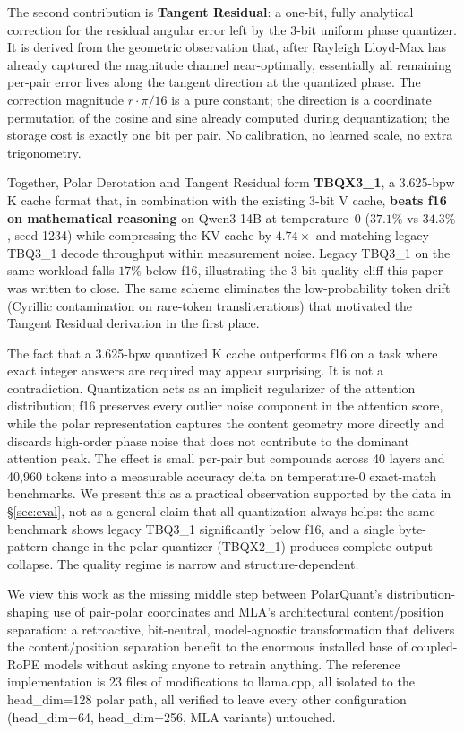 \documentclass[10pt,twocolumn]{article}
\begin{document}
The second contribution is \textbf{Tangent Residual}: a one-bit, fully analytical correction for the residual angular error left by the 3-bit uniform phase quantizer. It is derived from the geometric observation that, after Rayleigh Lloyd-Max has already captured the magnitude channel near-optimally, essentially all remaining per-pair error lives along the tangent direction at the quantized phase. The correction magnitude $r\cdot\pi/16$ is a pure constant; the direction is a coordinate permutation of the cosine and sine already computed during dequantization; the storage cost is exactly one bit per pair. No calibration, no learned scale, no extra trigonometry.

Together, Polar Derotation and Tangent Residual form \textbf{TBQX3\_1}, a 3.625-bpw K cache format that, in combination with the existing 3-bit V cache, \textbf{beats f16 on mathematical reasoning} on Qwen3-14B at temperature~$0$ ($37.1\%$ vs $34.3\%$, seed 1234) while compressing the KV cache by $4.74\times$ and matching legacy TBQ3\_1 decode throughput within measurement noise. Legacy TBQ3\_1 on the same workload falls $17\%$ below f16, illustrating the 3-bit quality cliff this paper was written to close. The same scheme eliminates the low-probability token drift (Cyrillic contamination on rare-token transliterations) that motivated the Tangent Residual derivation in the first place.

The fact that a 3.625-bpw quantized K cache outperforms f16 on a task where exact integer answers are required may appear surprising. It is not a contradiction. Quantization acts as an implicit regularizer of the attention distribution; f16 preserves every outlier noise component in the attention score, while the polar representation captures the content geometry more directly and discards high-order phase noise that does not contribute to the dominant attention peak. The effect is small per-pair but compounds across 40 layers and 40,960 tokens into a measurable accuracy delta on temperature-$0$ exact-match benchmarks. We present this as a practical observation supported by the data in \S\ref{sec:eval}, not as a general claim that all quantization always helps: the same benchmark shows legacy TBQ3\_1 significantly below f16, and a single byte-pattern change in the polar quantizer (TBQX2\_1) produces complete output collapse. The quality regime is narrow and structure-dependent.

We view this work as the missing middle step between PolarQuant's distribution-shaping use of pair-polar coordinates and MLA's architectural content/position separation: a retroactive, bit-neutral, model-agnostic transformation that delivers the content/position separation benefit to the enormous installed base of coupled-RoPE models without asking anyone to retrain anything. The reference implementation is 23 files of modifications to llama.cpp, all isolated to the head\_dim=128 polar path, all verified to leave every other configuration (head\_dim=64, head\_dim=256, MLA variants) untouched.
\end{document}
